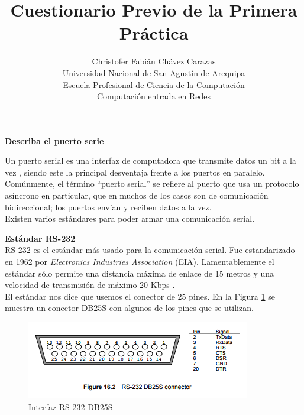\documentclass[a4paper,12pt]{article}
\begin{document}
\title{Cuestionario Previo de la Primera Práctica}
\author{
Christofer Fabián Chávez Carazas \\
\small{Universidad Nacional de San Agustín de Arequipa} \\
\small{Escuela Profesional de Ciencia de la Computación} \\
\small{Computación entrada en Redes}
}
\date{}

\maketitle

\begin{enumerate}
 {\large \item  \textbf{Describa el puerto serie}} \par
  Un puerto serial es una interfaz de computadora que transmite datos
  un bit a la vez \cite{serialbook}, siendo este la principal desventaja frente a los
  puertos en paralelo.
  Comúnmente, el término ``puerto serial'' se refiere al puerto
  que usa un protocolo asíncrono en particular, que en muchos de los casos
  son de comunicación bidireccional; los puertos envían y reciben datos a la vez. \\
  Existen varios estándares para poder armar una comunicación serial.
 
  {\large \textbf{Estándar RS-232}} \\
  RS-232 es el estándar más usado para la comunicación serial. 
  Fue estandarizado en 1962 por \textit{Electronics Industries Association} (EIA).
  Lamentablemente el estándar sólo permite una distancia máxima de enlace de 15 metros y
  una velocidad de transmisión de máximo 20 Kbps \cite{serialstandars}. \\
  El estándar nos dice que usemos el conector de 25 pines. En la Figura \ref{fig:db25}
  se muestra un conector DB25S con algunos de los pines que se utilizan.
  
  \begin{figure}
   \centering
   \includegraphics[scale = 0.6]{2.png}
   \caption{Interfaz RS-232 DB25S \cite{rs232}}
   \label{fig:db25}
  \end{figure}
  

\end{enumerate}
\end{document}
